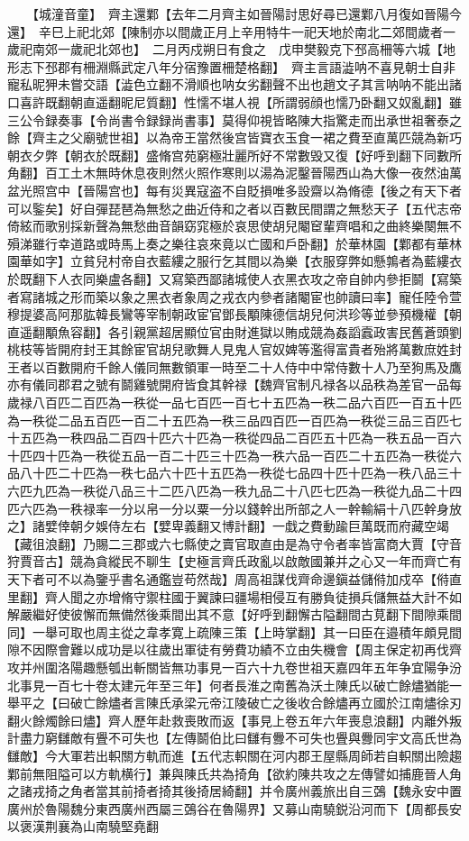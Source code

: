 　　【城潼音童】　齊主還鄴【去年二月齊主如晉陽討思好尋已還鄴八月復如晉陽今還】　辛巳上祀北郊【陳制亦以間歲正月上辛用特牛一祀天地於南北二郊間歲者一歲祀南郊一歲祀北郊也】　二月丙戍朔日有食之　戊申樊毅克下邳高柵等六城【地形志下邳郡有柵淵縣武定八年分宿豫置柵楚格翻】　齊主言語澁呐不喜見朝士自非寵私昵狎未嘗交語【澁色立翻不滑順也呐女劣翻聲不出也趙文子其言呐呐不能出諸口喜許既翻朝直遥翻昵尼質翻】性懦不堪人視【所謂弱顔也懦乃卧翻又奴亂翻】雖三公令録奏事【令尚書令録録尚書事】莫得仰視皆略陳大指驚走而出承世祖奢泰之餘【齊主之父廟號世祖】以為帝王當然後宫皆寶衣玉食一裙之費至直萬匹競為新巧朝衣夕弊【朝衣於既翻】盛脩宫苑窮極壯麗所好不常數毁又復【好呼到翻下同數所角翻】百工土木無時休息夜則然火照作寒則以湯為泥鑿晉陽西山為大像一夜然油萬盆光照宫中【晉陽宫也】每有災異寇盗不自貶損唯多設齋以為脩德【後之有天下者可以鍳矣】好自彈琵琶為無愁之曲近侍和之者以百數民間謂之無愁天子【五代志帝倚絃而歌别採新聲為無愁曲音韻窈窕極於哀思使胡兒閹䆠輩齊唱和之曲終樂闋無不殞涕雖行幸道路或時馬上奏之樂往哀來竟以亡國和戶卧翻】於華林園【鄴都有華林園華如字】立貧兒村帝自衣藍縷之服行乞其間以為樂【衣服穿弊如懸鶉者為藍縷衣於既翻下人衣同樂盧各翻】又寫築西鄙諸城使人衣黑衣攻之帝自帥内參拒鬬【寫築者寫諸城之形而築以象之黑衣者象周之戎衣内參者諸閹宦也帥讀曰率】寵任陸令萱穆提婆高阿那肱韓長鸞等宰制朝政宦官鄧長顒陳德信胡兒何洪珍等並參預機權【朝直遥翻顒魚容翻】各引親黨超居顯位官由財進獄以賄成競為姦謟蠧政害民舊蒼頭劉桃枝等皆開府封王其餘宦官胡兒歌舞人見鬼人官奴婢等濫得富貴者殆將萬數庶姓封王者以百數開府千餘人儀同無數領軍一時至二十人侍中中常侍數十人乃至狗馬及鷹亦有儀同郡君之號有鬬雞號開府皆食其幹禄【魏齊官制凡禄各以品秩為差官一品每歲禄八百匹二百匹為一秩從一品七百匹一百七十五匹為一秩二品六百匹一百五十匹為一秩從二品五百匹一百二十五匹為一秩三品四百匹一百匹為一秩從三品三百匹七十五匹為一秩四品二百四十匹六十匹為一秩從四品二百匹五十匹為一秩五品一百六十匹四十匹為一秩從五品一百二十匹三十匹為一秩六品一百匹二十五匹為一秩從六品八十匹二十匹為一秩七品六十匹十五匹為一秩從七品四十匹十匹為一秩八品三十六匹九匹為一秩從八品三十二匹八匹為一秩九品二十八匹七匹為一秩從九品二十四匹六匹為一秩禄率一分以帛一分以粟一分以錢幹出所部之人一幹輸絹十八匹幹身放之】諸嬖倖朝夕娛侍左右【嬖卑義翻又博計翻】一戱之費動踰巨萬既而府藏空竭【藏徂浪翻】乃賜二三郡或六七縣使之賣官取直由是為守令者率皆富商大賈【守音狩賈音古】競為貪縱民不聊生【史極言齊氏政亂以啟敵國兼并之心又一年而齊亡有天下者可不以為鑒乎書名通鑑豈苟然哉】周高祖謀伐齊命邊鎭益儲偫加戍卒【偫直里翻】齊人聞之亦增脩守禦柱國于翼諫曰疆場相侵互有勝負徒損兵儲無益大計不如解嚴繼好使彼懈而無備然後乘間出其不意【好呼到翻懈古隘翻間古莧翻下間隙乘間同】一舉可取也周主從之韋孝寛上疏陳三策【上時掌翻】其一曰臣在邉積年頗見間隙不因際會難以成功是以往歲出軍徒有勞費功績不立由失機會【周主保定初再伐齊攻并州圍洛陽趣懸瓠出斬關皆無功事見一百六十九卷世祖天嘉四年五年争宜陽争汾北事見一百七十卷太建元年至三年】何者長淮之南舊為沃土陳氏以破亡餘燼猶能一舉平之【曰破亡餘燼者言陳氏承梁元帝江陵破亡之後收合餘燼再立國於江南燼徐刃翻火餘燭餘曰燼】齊人歷年赴救喪敗而返【事見上卷五年六年喪息浪翻】内離外叛計盡力窮讎敵有舋不可失也【左傳鬬伯比曰讎有釁不可失也舋與釁同宇文高氏世為讎敵】今大軍若出軹關方軌而進【五代志軹關在河内郡王屋縣周師若自軹關出險趨鄴前無阻隘可以方軌横行】兼與陳氏共為掎角【欲約陳共攻之左傳譬如捕鹿晉人角之諸戎掎之角者當其前掎者掎其後掎居綺翻】并令廣州義旅出自三鵶【魏永安中置廣州於魯陽魏分東西廣州西屬三鵶谷在魯陽界】又募山南驍鋭沿河而下【周都長安以褒漢荆襄為山南驍堅堯翻
